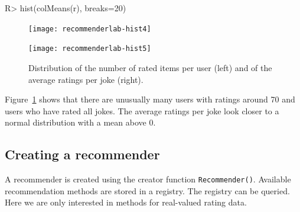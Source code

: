 \documentclass[nojss]{jss}
\newcommand{\func}[1]{\mbox{\texttt{#1()}}}
\begin{document}
\begin{Schunk}
\begin{Sinput}
R> hist(colMeans(r), breaks=20)
\end{Sinput}
\end{Schunk}

\begin{figure}
\begin{minipage}[b]{.48\linewidth}
\centerline{\texttt{[image: recommenderlab-hist4]}}
\end{minipage}
\begin{minipage}[b]{.48\linewidth}
\centerline{\texttt{[image: recommenderlab-hist5]}}
\end{minipage}
\caption{Distribution of the number of rated items per user (left) and
of the average ratings per joke (right).}
\label{fig:hist3}
\end{figure}


Figure~\ref{fig:hist3} shows that there are unusually many
users with ratings around 70 and users who have rated all jokes.
The average ratings per joke look closer to a normal distribution with
a mean above 0.


\subsection{Creating a recommender}

A recommender is created using the creator function \func{Recommender}.
Available recommendation methods are stored in a registry.
The registry can be queried. Here we are only interested in
methods for real-valued rating data.
\end{document}
